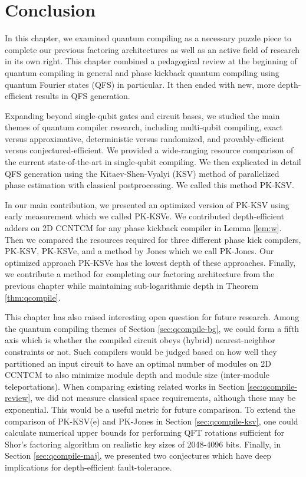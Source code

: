 \section{Conclusion}
\label{sec:qcompile-conclude}

In this chapter, we examined quantum compiling as a necessary
puzzle piece to complete our previous factoring architectures
as well as
an active field of research in its own right. This chapter
combined a pedagogical review at the beginning of quantum
compiling in general and phase kickback quantum compiling
using quantum Fourier states (QFS) in particular. It then ended
with new, more depth-efficient results in QFS generation.

Expanding beyond single-qubit gates and circuit bases, we
studied the main themes of quantum compiler research,
including multi-qubit compiling, exact versus approximative,
deterministic versus randomized, and provably-efficient versus
conjectured-efficient. We provided a wide-ranging resource
comparison
of the current state-of-the-art in single-qubit
compiling. We then explicated in detail QFS generation
using the Kitaev-Shen-Vyalyi (KSV) method of parallelized
phase estimation with classical postprocessing. We called
this method PK-KSV.

In our main contribution, we presented
an optimized version of PK-KSV using early measurement
which we called PK-KSVe. We contributed depth-efficient
adders on \textsf{2D CCNTCM} for any phase kickback
compiler in Lemma \ref{lem:w}. Then we compared the resources required
for three different phase kick compilers,
PK-KSV, PK-KSVe, and a method by Jones \cite{Jones2013}
which we call PK-Jones. Our optimized approach
PK-KSVe has the lowest depth of these approaches.
Finally, we contribute a method for completing
our factoring architecture from the previous chapter
while maintaining sub-logarithmic depth in
Theorem \ref{thm:qcompile}.

This chapter has also raised interesting open question for
future research.
Among the quantum compiling themes of Section \ref{sec:qcompile-bg},
we could form a
fifth axis which is whether the compiled circuit obeys (hybrid) nearest-neighbor
constraints or not. Such compilers would be judged based on how well
they partitioned an input circuit to have an optimal
number of modules on \textsf{2D CCNTCM} to also minimize module depth and
module size (inter-module teleportations).
When comparing existing related works in Section \ref{sec:qcompile-review},
we did not measure classical space requirements, although these may be
exponential. This would be a useful metric for future comparison.
To extend
the comparison of PK-KSV(e) and PK-Jones in Section \ref{sec:qcompile-ksv},
one could calculate numerical upper bounds
for performing QFT rotations sufficient for
Shor's factoring algorithm on realistic key sizes of
2048-4096 bits. Finally, in Section \ref{sec:qcompile-maj},
we presented two conjectures which have deep implications for
depth-efficient fault-tolerance.